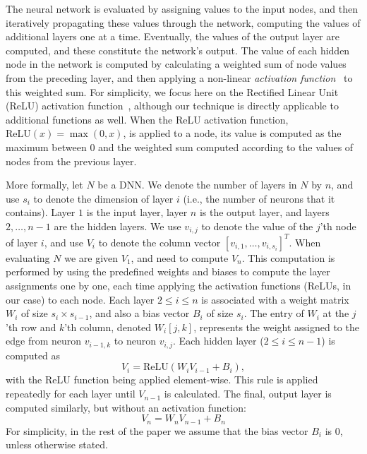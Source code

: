 \documentclass{easychair}
\newcommand{\relu}{\text{ReLU}\xspace{}}
\begin{document}
The neural network is evaluated by assigning values to the input
nodes, and then iteratively propagating these values through the
network, computing the values of additional layers one at a
time. Eventually, the values of the output layer are computed, and
these constitute the network's output.  The value of each hidden node
in the network is computed by calculating a weighted sum of node
values from the preceding layer, and then applying a non-linear
\emph{activation function}~\cite{FoBeCu16} to this weighted sum.  For simplicity, we focus
here on the Rectified Linear Unit (ReLU) activation
function~\cite{NaHi10}, although our technique is directly applicable
to additional functions as well.  When the ReLU activation function,
$\relu{}(x) = \max{}(0, x)$, is applied to a node, its value is
computed as the maximum between $0$ and the weighted sum computed
according to the values of nodes from
the previous layer.

More formally, let $N$ be a DNN. We
denote the number of layers in $N$ by $n$, and use $s_i$ to denote the
dimension of layer $i$ (i.e., the number of neurons that it contains).
Layer $1$ is the input layer, layer $n$ is the output layer, and
layers $2,\ldots,n-1$ are the hidden layers.
We use $v_{i,j}$  to denote the value of the $j$'th node of layer $i$,
and use $V_i$ to denote the column vector $[v_{i,1},\ldots,v_{i,s_i}]^T$.
When evaluating $N$ we are given $V_1$, and need to compute $V_n$.
This computation is 
performed by using the predefined weights and biases to compute the
layer assignments one by one, each time applying the activation
functions (ReLUs, in our case) to each node. Each layer $2\leq i\leq
n$
is associated
with a 
weight matrix $W_i$ of size $s_{i}\times s_{i-1}$, and also a bias vector $B_i$ of size
$s_i$. The entry of $W_i$ at the $j$'th row and $k$'th column, denoted
$W_i[j,k]$, represents the weight assigned to the edge from
neuron $v_{i-1,k}$ to neuron $v_{i,j}$.
Each hidden layer ($2\leq i \leq n-1$) 
is computed as
\[
V_i = \relu{}(W_i  V_{i-1} + B_i),
\]
with the ReLU
function being applied element-wise.
This rule is applied repeatedly for each layer until $V_{n-1}$ is
calculated.
The final, output layer is
computed similarly, but without an activation function:
\[
  V_n = W_n  V_{n-1} + B_n
\]
For simplicity, in the rest of the paper we assume that 
the bias vector $B_i$ is $0$, unless otherwise stated.
\end{document}
